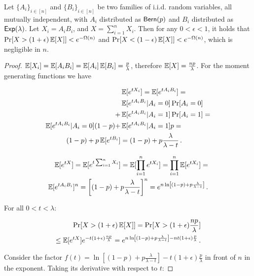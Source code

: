 \begin{theorem}\label{thm:bern-exp}
  Let $\{ A_i \}_{i \in [n]}$ and $\{ B_i \}_{i \in [n]}$ be two families of i.i.d. random variables,
  all mutually independent,
  with $A_i$ distributed as $\textsf{Bern}(p)$ and $B_i$ distributed as $\textsf{Exp}(\lambda)$.
  Let $X_i = A_i B_i$, and $X = \sum_{i = 1}^n X_i$.
  Then for any $0 < \epsilon < 1$, it holds that
  $\Pr[X > (1 + \epsilon) \mathop{{}\mathbb{E}}[X]] < e^{-\Omega(n)}$ and
  $\Pr[X < (1 - \epsilon) \mathop{{}\mathbb{E}}[X]] < e^{-\Omega(n)}$,
  which is negligible in $n$.
\end{theorem}
\begin{proof}
  $\mathop{{}\mathbb{E}}[X_i] = \mathop{{}\mathbb{E}}[A_i B_i] = \mathop{{}\mathbb{E}}[A_i] \mathop{{}\mathbb{E}}[B_i] = \frac{p}{\lambda}$, therefore
  $\mathop{{}\mathbb{E}}[X] = \frac{np}{\lambda}$. For the moment generating functions we have

  \begin{align*}
    &\mathop{{}\mathbb{E}}[e^{t X_i}] = \mathop{{}\mathbb{E}}[e^{t A_i B_i}] =\\
      &\mathop{{}\mathbb{E}}[e^{t A_i B_i}|A_i = 0] \Pr[A_i = 0]\\
    + &\mathop{{}\mathbb{E}}[e^{t A_i B_i}|A_i = 1] \Pr[A_i = 1] = \\
    \mathop{{}\mathbb{E}}[e^{t A_i B_i}|A_i = 0] (1 - p) + &\mathop{{}\mathbb{E}}[e^{t A_i B_i}|A_i = 1] p = \\
    (1 - p) + p \mathop{{}\mathbb{E}}[e^{t B_i}] &= (1 - p) + p \frac{\lambda}{\lambda - t}\,.
  \end{align*}

  \begin{align*}
    \mathop{{}\mathbb{E}}[e^{tX}] = \mathop{{}\mathbb{E}}[e^{t \sum_{i = 1}^n X_i}] = \mathop{{}\mathbb{E}}[\prod_{i = 1}^n e^{t X_i}] = \prod_{i = 1}^n \mathop{{}\mathbb{E}}[e^{t X_i}] = \\
    \mathop{{}\mathbb{E}}[e^{t A_i B_i}]^n = \left[(1 - p) + p\frac{\lambda}{\lambda - t}\right]^n = e^{n \ln\left[(1 - p) + p\frac{\lambda}{\lambda - t}\right]}\,.
  \end{align*}

  For all $0 < t < \lambda$:

  \begin{align*}
    \Pr[X > (1 + \epsilon)\mathop{{}\mathbb{E}}[X]] = \Pr[X > (1 + \epsilon)\frac{np}{\lambda}]\\
    \leq \mathop{{}\mathbb{E}}[e^{tX}] e^{-t(1 + \epsilon)\frac{np}{\lambda}}
    = e^{n \ln\left[(1 - p) + p\frac{\lambda}{\lambda - t}\right] - n t(1 + \epsilon)\frac{p}{\lambda}}\,.
  \end{align*}

  Consider the factor
  $f(t) = \ln\left[(1 - p) + p\frac{\lambda}{\lambda - t}\right] - t(1 + \epsilon)\frac{p}{\lambda}$
  in front of $n$ in the exponent. Taking its derivative with respect to $t$:


\end{proof}

